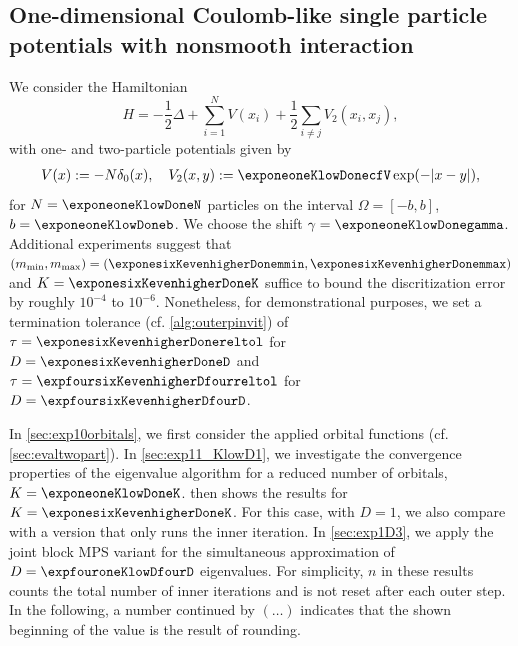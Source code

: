 \documentclass[a4paper,11pt,oneside]{amsart}
\theoremstyle{definition}
\theoremstyle{remark}
\numberwithin{equation}{section}
\numberwithin{theorem}{section}
\begin{document}
\subsection{One-dimensional Coulomb-like single particle potentials with nonsmooth interaction}\label{sec:exp10}
%
We consider the Hamiltonian
\begin{equation*}
   H = - \frac12 \Delta + \sum_{i=1}^N V(x_i) + \frac12 \sum_{i \neq j} V_2(x_i,x_j), 
\end{equation*}
with one- and two-particle potentials given by
\begin{align*}
 V(x) := -N \delta_0(x), \quad V_2(x,y) := \exponeoneKlowDonecfV \exp(-|x - y|),
\end{align*}
for $N = \exponeoneKlowDoneN$ particles on the interval $\Omega = [-b,b]$, $b = \exponeoneKlowDoneb$. We choose the shift $\gamma = \exponeoneKlowDonegamma$. Additional experiments suggest that $(m_{\min},m_{\max}) = (\exponesixKevenhigherDonemmin,\exponesixKevenhigherDonemmax)$ and $K = \exponesixKevenhigherDoneK$ suffice to bound the discritization error by roughly $10^{-4}$ to $10^{-6}$. Nonetheless, for demonstrational purposes, we set a termination tolerance (cf. \cref{alg:outerpinvit}) of $\tau = \exponesixKevenhigherDonereltol$ for $D = \exponesixKevenhigherDoneD$ and $\tau = \expfoursixKevenhigherDfourreltol$ for $D = \expfoursixKevenhigherDfourD$.

In \cref{sec:exp10orbitals}, we first consider the applied orbital functions (cf. \cref{sec:evaltwopart}). In \cref{sec:exp11_KlowD1}, we investigate the convergence properties of the eigenvalue algorithm for a reduced number of orbitals, $K = \exponeoneKlowDoneK$. 
 then shows the results for $K = \exponesixKevenhigherDoneK$. For this case, with $D = 1$, we also compare with a version that only runs the inner iteration. In \cref{sec:exp1D3}, we apply the joint block MPS variant for the simultaneous approximation of $D = \expfouroneKlowDfourD$ eigenvalues. For simplicity, $n$ in these results counts the total number of inner iterations and is not reset after each outer step. In the following, a number continued by $\mathtt{(\ldots)}$ indicates that the shown beginning of the value is the result of rounding.
\end{document}
